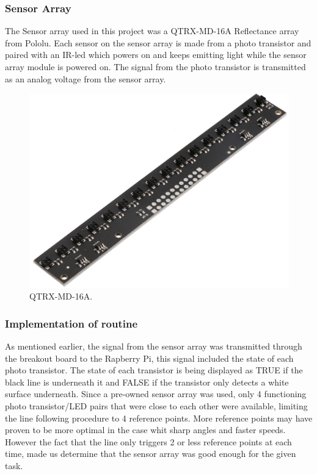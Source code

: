 \subsubsection{Sensor Array}
The Sensor array used in this project was a QTRX-MD-16A Reflectance array from Pololu. Each sensor on the sensor array is made from a photo transistor and paired with an IR-led which powers on and keeps emitting light while the sensor array module is powered on. The signal from the photo transistor is transmitted as an analog voltage from the sensor array.
\begin{figure}[h]
    \centering
    \includegraphics[width =\linewidth]{sections/assets/Sensor_array.jpg}
    \caption{QTRX-MD-16A.}
    \label{Sensor_array}
\end{figure}
\subsubsection{Implementation of routine}
As mentioned earlier, the signal from the sensor array was transmitted through the breakout board to the Rapberry Pi, this signal included the state of each photo transistor. The state of each transistor is being displayed as TRUE if the black line is underneath it and FALSE if the transistor only detects a white surface underneath. Since a pre-owned sensor array was used, only 4 functioning photo transistor/LED pairs that were close to each other were available, limiting the line following procedure to 4 reference points. More reference points may have proven to be more optimal in the case whit sharp angles and faster speeds. However the fact that the line only triggers 2 or less reference points at each time, made us determine that the sensor array was good enough for the given task.

